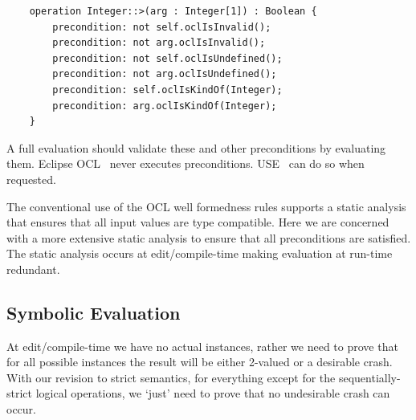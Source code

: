 \documentclass[
]{ceurart}
\begin{document}
\begin{verbatim}
    operation Integer::>(arg : Integer[1]) : Boolean {
        precondition: not self.oclIsInvalid();
        precondition: not arg.oclIsInvalid();
        precondition: not self.oclIsUndefined();
        precondition: not arg.oclIsUndefined();
        precondition: self.oclIsKindOf(Integer);
        precondition: arg.oclIsKindOf(Integer);
    }
\end{verbatim}

A full evaluation should validate these and other preconditions by evaluating them. Eclipse OCL~\cite{Eclipse-OCL} never executes preconditions. USE~\cite{USE} can do so when requested.

The conventional use of the OCL well formedness rules supports a static analysis that ensures that all input values are type compatible. Here we are concerned with a more extensive  static analysis to ensure that all preconditions are satisfied. The static analysis occurs at edit/compile-time making evaluation at run-time redundant.

\subsection{Symbolic Evaluation}\label{Symbolic Evaluation}



At edit/compile-time we have no actual instances, rather we need to prove that for all possible instances the result will be either 2-valued or a desirable crash. With our revision to strict semantics, for everything except for the sequentially-strict logical operations, we `just' need to prove that no undesirable crash can occur.
\end{document}
